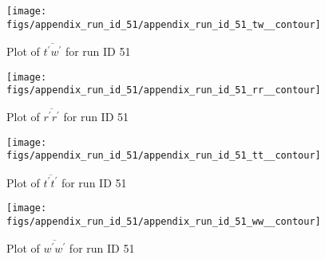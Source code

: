 \begin{figure}[H]
\centering
\texttt{[image: figs/appendix\_run\_id\_51/appendix\_run\_id\_51\_tw\_\_contour]}
\caption{Plot of $\overline{t^\prime w^\prime}$ for run ID 51}
\label{fig:appendix_run_id_51_tw__contour}
\end{figure}


\begin{figure}[H]
\centering
\texttt{[image: figs/appendix\_run\_id\_51/appendix\_run\_id\_51\_rr\_\_contour]}
\caption{Plot of $\overline{r^\prime r^\prime}$ for run ID 51}
\label{fig:appendix_run_id_51_rr__contour}
\end{figure}


\begin{figure}[H]
\centering
\texttt{[image: figs/appendix\_run\_id\_51/appendix\_run\_id\_51\_tt\_\_contour]}
\caption{Plot of $\overline{t^\prime t^\prime}$ for run ID 51}
\label{fig:appendix_run_id_51_tt__contour}
\end{figure}


\begin{figure}[H]
\centering
\texttt{[image: figs/appendix\_run\_id\_51/appendix\_run\_id\_51\_ww\_\_contour]}
\caption{Plot of $\overline{w^\prime w^\prime}$ for run ID 51}
\label{fig:appendix_run_id_51_ww__contour}
\end{figure}


